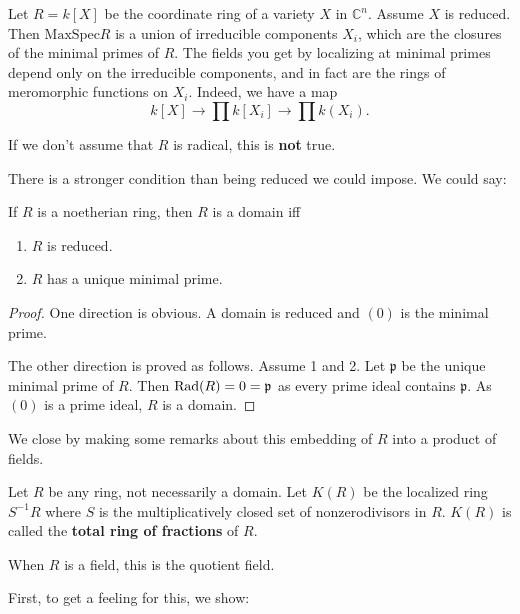 \begin{example}
Let $R = k[X]$ be the coordinate ring of a variety $X$ in
$\mathbb{C}^n$. Assume $X$ is
reduced. Then $\mathrm{MaxSpec} R$ is a union of irreducible components
$X_i$, which
are the closures of the minimal primes of $R$. The fields you get by localizing
at minimal primes depend only on the irreducible components, and in fact are
the rings of meromorphic functions on $X_i$.
Indeed, we have a map
\[ k[X] \to \prod k[X_i] \to \prod k(X_i).  \]

If we don't assume that $R$ is radical, this is \textbf{not} true.
\end{example}

There is a stronger condition than being reduced we could impose. We could say:

\begin{proposition}
If $R$ is a noetherian ring, then $R$ is a domain iff
\begin{enumerate}
\item $R$ is reduced.
\item $R$ has a unique minimal prime.
\end{enumerate}
\end{proposition}
\begin{proof}
One direction is obvious. A domain is reduced and $(0)$ is the minimal prime.

The other direction is proved as follows. Assume 1 and 2. Let $\mathfrak{p}$ be
the unique minimal prime of $R$. Then $\operatorname{Rad} (R) = 0 = \mathfrak{p}$ as every
prime ideal contains $\mathfrak{p}$. As $(0)$ is a prime ideal, $R$ is
a domain.
\end{proof}

We close by making some remarks about this embedding of $R$ into a product of
fields.

\begin{definition}
Let $R$ be any ring, not necessarily a domain. Let $K(R)$ be the localized ring
$S^{-1}R$ where $S$ is the multiplicatively closed set of nonzerodivisors in
$R$.  $K(R)$ is called the \textbf{total ring of fractions} of $R$.

When $R$ is a field, this is the quotient field.
\end{definition}

First, to get a feeling for this, we show:

